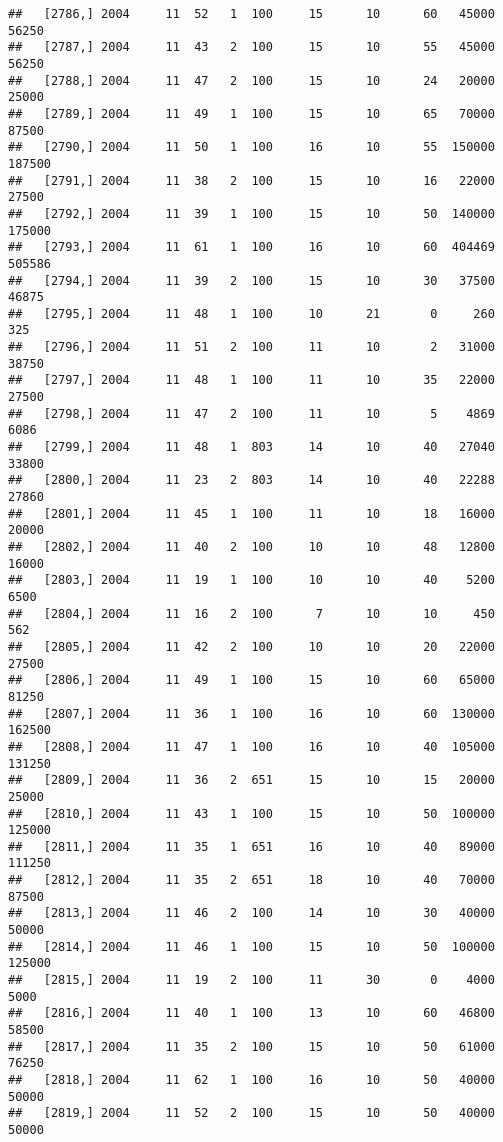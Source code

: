\documentclass{article}\usepackage[]{graphicx}\usepackage[]{color}
\makeatletter
\newenvironment{kframe}{%
 \def\at@end@of@kframe{}%
 \ifinner\ifhmode%
  \def\at@end@of@kframe{\end{minipage}}%
  \begin{minipage}{\columnwidth}%
 \fi\fi%
 \def\FrameCommand##1{\hskip\@totalleftmargin \hskip-\fboxsep
 \colorbox{shadecolor}{##1}\hskip-\fboxsep
     \hskip-\linewidth \hskip-\@totalleftmargin \hskip\columnwidth}%
 \MakeFramed {\advance\hsize-\width
   \@totalleftmargin\z@ \linewidth\hsize
   \@setminipage}}%
 {\par\unskip\endMakeFramed%
 \at@end@of@kframe}
\newenvironment{knitrout}{}{} %
\makeatother
\begin{document}
\begin{knitrout}
\begin{kframe}
\begin{verbatim}
##   [2786,] 2004     11  52   1  100     15      10      60   45000   56250
##   [2787,] 2004     11  43   2  100     15      10      55   45000   56250
##   [2788,] 2004     11  47   2  100     15      10      24   20000   25000
##   [2789,] 2004     11  49   1  100     15      10      65   70000   87500
##   [2790,] 2004     11  50   1  100     16      10      55  150000  187500
##   [2791,] 2004     11  38   2  100     15      10      16   22000   27500
##   [2792,] 2004     11  39   1  100     15      10      50  140000  175000
##   [2793,] 2004     11  61   1  100     16      10      60  404469  505586
##   [2794,] 2004     11  39   2  100     15      10      30   37500   46875
##   [2795,] 2004     11  48   1  100     10      21       0     260     325
##   [2796,] 2004     11  51   2  100     11      10       2   31000   38750
##   [2797,] 2004     11  48   1  100     11      10      35   22000   27500
##   [2798,] 2004     11  47   2  100     11      10       5    4869    6086
##   [2799,] 2004     11  48   1  803     14      10      40   27040   33800
##   [2800,] 2004     11  23   2  803     14      10      40   22288   27860
##   [2801,] 2004     11  45   1  100     11      10      18   16000   20000
##   [2802,] 2004     11  40   2  100     10      10      48   12800   16000
##   [2803,] 2004     11  19   1  100     10      10      40    5200    6500
##   [2804,] 2004     11  16   2  100      7      10      10     450     562
##   [2805,] 2004     11  42   2  100     10      10      20   22000   27500
##   [2806,] 2004     11  49   1  100     15      10      60   65000   81250
##   [2807,] 2004     11  36   1  100     16      10      60  130000  162500
##   [2808,] 2004     11  47   1  100     16      10      40  105000  131250
##   [2809,] 2004     11  36   2  651     15      10      15   20000   25000
##   [2810,] 2004     11  43   1  100     15      10      50  100000  125000
##   [2811,] 2004     11  35   1  651     16      10      40   89000  111250
##   [2812,] 2004     11  35   2  651     18      10      40   70000   87500
##   [2813,] 2004     11  46   2  100     14      10      30   40000   50000
##   [2814,] 2004     11  46   1  100     15      10      50  100000  125000
##   [2815,] 2004     11  19   2  100     11      30       0    4000    5000
##   [2816,] 2004     11  40   1  100     13      10      60   46800   58500
##   [2817,] 2004     11  35   2  100     15      10      50   61000   76250
##   [2818,] 2004     11  62   1  100     16      10      50   40000   50000
##   [2819,] 2004     11  52   2  100     15      10      50   40000   50000

\end{verbatim}
\end{kframe}
\end{knitrout}
\end{document}

